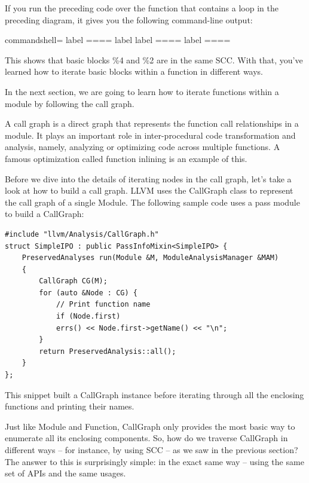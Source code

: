 If you run the preceding code over the function that contains a loop in the preceding diagram, it gives you the following command-line output:

\begin{tcblisting}{commandshell={}}
label %
====
label %
label %
====
label %
====
\end{tcblisting}

This shows that basic blocks \%4 and \%2 are in the same SCC. With that, you've learned how to iterate basic blocks within a function in different ways.

In the next section, we are going to learn how to iterate functions within a module by following the call graph.


A call graph is a direct graph that represents the function call relationships in a module. It plays an important role in inter-procedural code transformation and analysis, namely, analyzing or optimizing code across multiple functions. A famous optimization called function inlining is an example of this.

Before we dive into the details of iterating nodes in the call graph, let's take a look at how to build a call graph. LLVM uses the CallGraph class to represent the call graph of a single Module. The following sample code uses a pass module to build a CallGraph:

\begin{lstlisting}[style=styleCXX]
#include "llvm/Analysis/CallGraph.h"
struct SimpleIPO : public PassInfoMixin<SimpleIPO> {
	PreservedAnalyses run(Module &M, ModuleAnalysisManager &MAM)
	{
		CallGraph CG(M);
		for (auto &Node : CG) {
			// Print function name
			if (Node.first)
			errs() << Node.first->getName() << "\n";
		}
		return PreservedAnalysis::all();
	}
};
\end{lstlisting}

This snippet built a CallGraph instance before iterating through all the enclosing functions and printing their names.

Just like Module and Function, CallGraph only provides the most basic way to enumerate all its enclosing components. So, how do we traverse CallGraph in different ways – for instance, by using SCC – as we saw in the previous section? The answer to this is surprisingly simple: in the exact same way – using the same set of APIs and the same usages.

